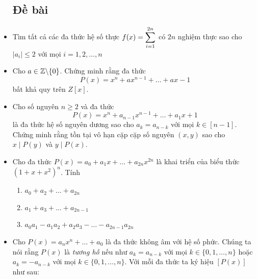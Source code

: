 \documentclass[11pt]{scrartcl}
\begin{document}
\begin{itemize}[label=, leftmargin=0em, itemsep=-0em]
        \subsection{\LARGE \textcolor{dk}{Đề bài}}
        \item \begin{btvn}
            Tìm tất cả các đa thức hệ số thực $f(x) = \displaystyle\sum_{i = 1}^{2n}$ có $2n$ nghiệm thực sao cho $|a_i| \leq 2$ với mọi $i = 1,2,\dots,n$
        \end{btvn}
        \item \begin{btvn}
            Cho $a \in \mathbb{Z}\backslash \{0\}$. Chứng minh rằng đa thức
            \[
                P(x) = x^n + ax^{n - 1} + \dots + ax - 1
            \]
            bất khả quy trên $Z[x]$.
        \end{btvn}
        \item \begin{btvn} Cho số nguyên $n \geq 2$ và đa thức
        \[
            P(x) = x^n + a_{n - 1}x^{n - 1} +\dots + a_1x+1
        \]
        là đa thức hệ số nguyên dương sao cho $a_k = a_{n - k}$ với mọi $k \in [n - 1]$. Chứng minh rằng tồn tại vô hạn cặp cặp số nguyên $(x,y)$ sao cho $x \mid P(y)$ và $y \mid P(x)$.
        \end{btvn}
        \item \begin{btvn}
            Cho đa thức $P(x) = a_0 + a_1x + \dots + a_{2n}x^{2n}$ là khai triển của biểu thức $(1 + x + x^2)^n$. Tính
            \begin{enumerate}[label=(\alph*)]
                \item $a_0 + a_2 + \dots + a_{2n}$
                \item $a_1 + a_3 + \dots + a_{2n - 1}$
                \item $a_0a_1 - a_1a_2 + a_2a_3 -\dots- a_{2n - 1}a_{2n}$
            \end{enumerate}
        \end{btvn}
        \item \begin{btvn}
            Cho $P(x) = a_nx^n + \dots + a_0$ là đa thức không âm với hệ số phức. Chúng ta nói rằng $P(x)$ là \textit{tương hỗ} nếu như $a_k = a_{n - k}$ với mọi $k \in \{0,1,\dots,n\}$ hoặc $a_k = -a_{n - k}$ với mọi $k \in \{0,1,\dots,n\}$. Với mỗi đa thức ta ký hiệu $[P(x)]$ như sau: 
            \begin{enumerate}

\end{enumerate}
\end{btvn}
\end{itemize}
\end{document}
